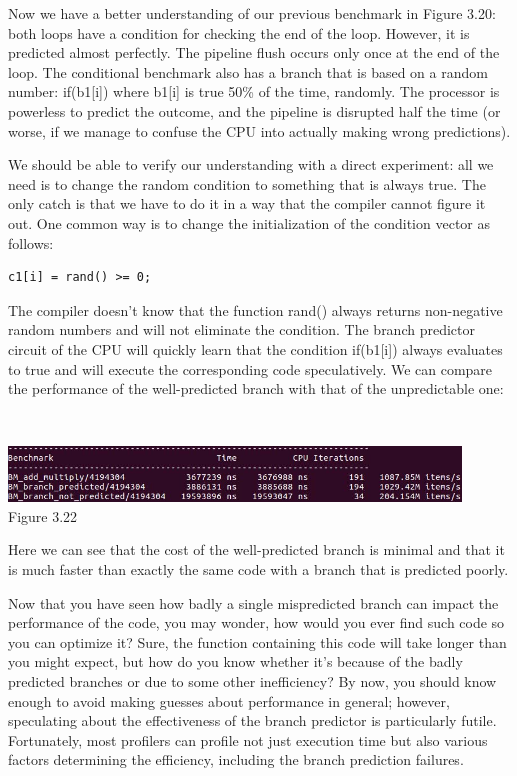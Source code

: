 Now we have a better understanding of our previous benchmark in Figure 3.20: both loops have a condition for checking the end of the loop. However, it is predicted almost perfectly. The pipeline flush occurs only once at the end of the loop. The conditional benchmark also has a branch that is based on a random number: if(b1[i]) where b1[i] is true 50\% of the time, randomly. The processor is powerless to predict the outcome, and the pipeline is disrupted half the time (or worse, if we manage to confuse the CPU into actually making wrong predictions).

We should be able to verify our understanding with a direct experiment: all we need is to change the random condition to something that is always true. The only catch is that we have to do it in a way that the compiler cannot figure it out. One common way is to change the initialization of the condition vector as follows:

\begin{lstlisting}[style=styleCXX]
c1[i] = rand() >= 0;
\end{lstlisting}

The compiler doesn't know that the function rand() always returns non-negative random numbers and will not eliminate the condition. The branch predictor circuit of the CPU will quickly learn that the condition if(b1[i]) always evaluates to true and will execute the corresponding code speculatively. We can compare the performance of the well-predicted branch with that of the unpredictable one:

\hspace*{\fill} \\ %
\begin{center}
\includegraphics[width=0.9\textwidth]{content/1/chapter3/images/22.jpg}\\
Figure 3.22
\end{center}

Here we can see that the cost of the well-predicted branch is minimal and that it is much faster than exactly the same code with a branch that is predicted poorly.


Now that you have seen how badly a single mispredicted branch can impact the performance of the code, you may wonder, how would you ever find such code so you can optimize it? Sure, the function containing this code will take longer than you might expect, but how do you know whether it's because of the badly predicted branches or due to some other inefficiency? By now, you should know enough to avoid making guesses about performance in general; however, speculating about the effectiveness of the branch predictor is particularly futile. Fortunately, most profilers can profile not just execution time but also various factors determining the efficiency, including the branch prediction failures.


